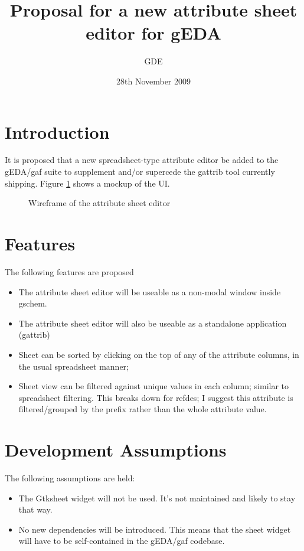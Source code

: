 \documentclass[a4,10pt]{article}
\title{Proposal for a new attribute sheet editor for gEDA}
\author{GDE}
\date{28th November 2009}
\begin{document}
\maketitle
\section{Introduction}
It is proposed that a new spreadsheet-type attribute editor be added
to the gEDA/gaf suite to supplement and/or supercede the gattrib tool
currently shipping. Figure \ref{fig:wireframe} shows a mockup of the
UI.
\begin{figure}
\caption{Wireframe of the attribute sheet editor}
\label{fig:wireframe}
\end{figure}
\section{Features}
The following features are proposed
\begin{itemize}

\item The attribute sheet editor will be useable as a non-modal window
  inside gschem.

\item The attribute sheet editor will also be useable as a standalone
  application (gattrib)

\item Sheet can be sorted by clicking on the top of any of the
  attribute columns, in the usual spreadsheet manner;

\item Sheet view can be filtered against unique values in each column;
  similar to spreadsheet filtering. This breaks down for refdes; I
  suggest this attribute is filtered/grouped by the prefix rather than
  the whole attribute value.

\end{itemize}
%
\section{Development Assumptions}
The following assumptions are held:
\begin{itemize}

\item The Gtksheet widget will not be used. It's not maintained and likely to
  stay that way.

\item No new dependencies will be introduced. This means that the
  sheet widget will have to be self-contained in the gEDA/gaf
  codebase.

\end{itemize}
\end{document}
